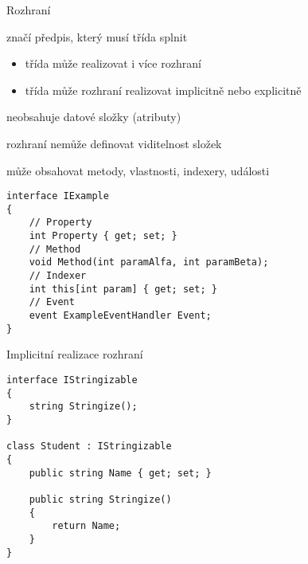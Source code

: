 


\begin{frame}[fragile]
\begin{bitemize}{Rozhraní}
\item značí předpis, který musí třída splnit
\begin{itemize}
\item třída může realizovat i více rozhraní
\item třída může rozhraní realizovat implicitně nebo explicitně
\end{itemize}
\item neobsahuje datové složky (atributy)
\item rozhraní nemůže definovat viditelnost složek
\item může obsahovat metody, vlastnosti, indexery, události
\end{bitemize}
\vfill
\begin{yesblock}
\begin{lstlisting}[basicstyle=\small]
interface IExample
{
    // Property
    int Property { get; set; }
    // Method
    void Method(int paramAlfa, int paramBeta);
    // Indexer
    int this[int param] { get; set; }
    // Event
    event ExampleEventHandler Event;
}
\end{lstlisting}
\end{yesblock}
\end{frame}




\begin{frame}[fragile]
\vfill
\begin{block}{}
Implicitní realizace rozhraní
\end{block}
\vfill
\begin{yesblock}
\begin{lstlisting}[basicstyle=\small]
interface IStringizable
{
    string Stringize();
}

class Student : IStringizable
{
    public string Name { get; set; }

    public string Stringize()
    {
        return Name;
    }
}
\end{lstlisting}
\end{yesblock}
\vfill
\end{frame}


